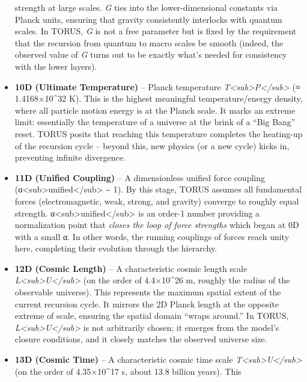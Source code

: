 \begin{itemize}
  strength at large scales. \emph{G} ties into the lower-dimensional
  constants via Planck units, ensuring that gravity consistently
  interlocks with quantum scales​. In TORUS, \emph{G} is not a free
  parameter but is fixed by the requirement that the recursion from
  quantum to macro scales be smooth (indeed, the observed value of
  \emph{G} turns out to be exactly what's needed for consistency with
  the lower layers)​.
\item
  \textbf{10D (Ultimate Temperature)} -- Planck temperature
  \emph{T\textless{}sub\textgreater{}P\textless{}/sub\textgreater{}} (≈
  1.4168×10\^{}32 K)​. This is the highest meaningful temperature/energy
  density, where all particle motion energy is at the Planck scale. It
  marks an extreme limit: essentially the temperature of a universe at
  the brink of a ``Big Bang'' reset. TORUS posits that reaching this
  temperature completes the heating-up of the recursion cycle​ -- beyond
  this, new physics (or a new cycle) kicks in, preventing infinite
  divergence.
\item
  \textbf{11D (Unified Coupling)} -- A dimensionless unified force
  coupling
  (α\textless{}sub\textgreater{}unified\textless{}/sub\textgreater{}
  \textasciitilde{} 1)​. By this stage, TORUS assumes all fundamental
  forces (electromagnetic, weak, strong, and gravity) converge to
  roughly equal strength.
  α\textless{}sub\textgreater{}unified\textless{}/sub\textgreater{} is
  an order-1 number providing a normalization point that \emph{closes
  the loop of force strengths} which began at 0D with a small α. In
  other words, the running couplings of forces reach unity here,
  completing their evolution through the hierarchy​.
\item
  \textbf{12D (Cosmic Length)} -- A characteristic cosmic length scale
  \emph{L\textless{}sub\textgreater{}U\textless{}/sub\textgreater{}} (on
  the order of 4.4×10\^{}26 m, roughly the radius of the observable
  universe)​. This represents the maximum spatial extent of the current
  recursion cycle. It mirrors the 2D Planck length at the opposite
  extreme of scale, ensuring the spatial domain ``wraps around.'' In
  TORUS,
  \emph{L\textless{}sub\textgreater{}U\textless{}/sub\textgreater{}} is
  not arbitrarily chosen; it emerges from the model's closure
  conditions, and it closely matches the observed universe size.
\item
  \textbf{13D (Cosmic Time)} -- A characteristic cosmic time scale
  \emph{T\textless{}sub\textgreater{}U\textless{}/sub\textgreater{}} (on
  the order of 4.35×10\^{}17 s, about 13.8 billion years)​. This

\end{itemize}
